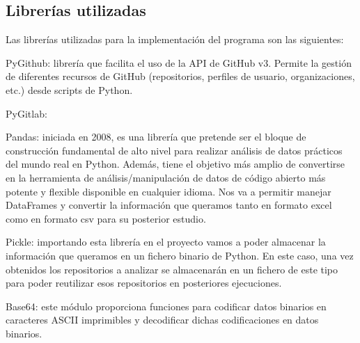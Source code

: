 \subsection{Librerías utilizadas}
Las librerías utilizadas para la implementación del programa son las siguientes:
\begin{compactitem}
    \item PyGithub: librería que facilita el uso de la API de GitHub v3. Permite la gestión de diferentes recursos de GitHub (repositorios, perfiles de usuario, organizaciones, etc.) desde scripts de Python.
    \item PyGitlab:
    \item Pandas: iniciada en 2008, es una librería que pretende ser el bloque de construcción fundamental de alto nivel para realizar análisis de datos prácticos del mundo real en Python. Además, tiene el objetivo más amplio de convertirse en la herramienta de análisis/manipulación de datos de código abierto más potente y flexible disponible en cualquier idioma. Nos va a permitir manejar DataFrames y convertir la información que queramos tanto en formato excel como en formato csv para su posterior estudio.
    \item Pickle: importando esta librería en el proyecto vamos a poder almacenar la información que queramos en un fichero binario de Python. En este caso, una vez obtenidos los repositorios a analizar se almacenarán en un fichero de este tipo para poder reutilizar esos repositorios en posteriores ejecuciones.
    \item Base64: este módulo proporciona funciones para codificar datos binarios en caracteres ASCII imprimibles y decodificar dichas codificaciones en datos binarios.
\end{compactitem}


